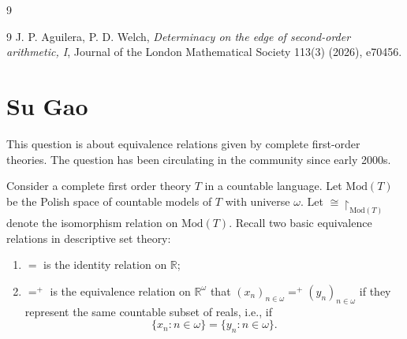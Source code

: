 \documentclass[11pt]{amsart}
\theoremstyle{definition}
\newcommand{\abstractauthor}[1]{\noindent\textbf{#1}\par\vspace{0.3\baselineskip}}
\begin{document}
\vskip -10pt
\begin{bibentry}{9}
\begin{thebibliography}{9}
 J. P. Aguilera, P. D. Welch, \textit{Determinacy on the edge of second-order arithmetic, I}, Journal of the London Mathematical Society 113(3) (2026), e70456.
\end{thebibliography}
\end{bibentry}






























\bigskip
\bigskip































\bigskip
\bigskip




\section{Su Gao}
\quad This question is about equivalence relations given by complete first-order theories. The question has been circulating in the community since early 2000s.

Consider a complete first order theory $T$ in a countable language. Let
$\mathrm{Mod}(T)$ be the Polish space of countable models of $T$ with universe $\omega$. Let $\cong\restriction_{\mathrm{Mod}(T)}$ denote the isomorphism relation on $\mathrm{Mod}(T)$. Recall two basic equivalence relations in descriptive set theory:
\begin{enumerate}
    \item $=$ is the identity relation on $\mathbb{R}$;
    \item $=^+$ is the equivalence relation on $\mathbb{R}^\omega$ that $(x_n)_{n\in\omega}=^+(y_n)_{n\in\omega}$ if they represent the same countable subset of reals, i.e., if
    $$ \{x_n\colon n\in\omega\}=\{y_n\colon n\in\omega\}.$$ 
\end{enumerate}
\end{document}
